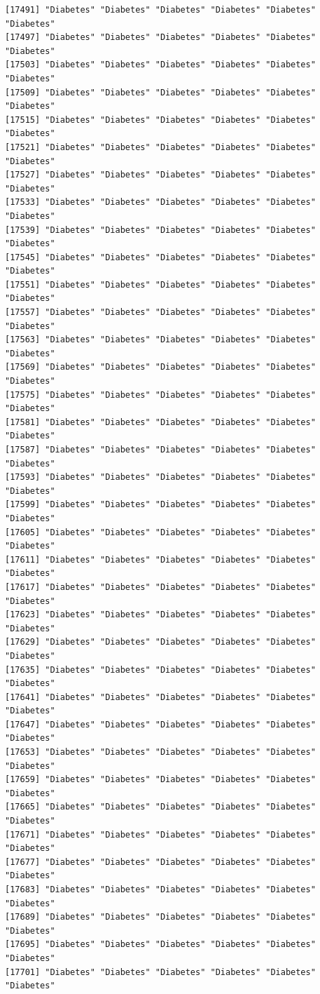 \documentclass[
  letterpaper,
  DIV=11,
  numbers=noendperiod]{scrartcl}
\begin{document}
\begin{verbatim}
[17491] "Diabetes" "Diabetes" "Diabetes" "Diabetes" "Diabetes" "Diabetes"
[17497] "Diabetes" "Diabetes" "Diabetes" "Diabetes" "Diabetes" "Diabetes"
[17503] "Diabetes" "Diabetes" "Diabetes" "Diabetes" "Diabetes" "Diabetes"
[17509] "Diabetes" "Diabetes" "Diabetes" "Diabetes" "Diabetes" "Diabetes"
[17515] "Diabetes" "Diabetes" "Diabetes" "Diabetes" "Diabetes" "Diabetes"
[17521] "Diabetes" "Diabetes" "Diabetes" "Diabetes" "Diabetes" "Diabetes"
[17527] "Diabetes" "Diabetes" "Diabetes" "Diabetes" "Diabetes" "Diabetes"
[17533] "Diabetes" "Diabetes" "Diabetes" "Diabetes" "Diabetes" "Diabetes"
[17539] "Diabetes" "Diabetes" "Diabetes" "Diabetes" "Diabetes" "Diabetes"
[17545] "Diabetes" "Diabetes" "Diabetes" "Diabetes" "Diabetes" "Diabetes"
[17551] "Diabetes" "Diabetes" "Diabetes" "Diabetes" "Diabetes" "Diabetes"
[17557] "Diabetes" "Diabetes" "Diabetes" "Diabetes" "Diabetes" "Diabetes"
[17563] "Diabetes" "Diabetes" "Diabetes" "Diabetes" "Diabetes" "Diabetes"
[17569] "Diabetes" "Diabetes" "Diabetes" "Diabetes" "Diabetes" "Diabetes"
[17575] "Diabetes" "Diabetes" "Diabetes" "Diabetes" "Diabetes" "Diabetes"
[17581] "Diabetes" "Diabetes" "Diabetes" "Diabetes" "Diabetes" "Diabetes"
[17587] "Diabetes" "Diabetes" "Diabetes" "Diabetes" "Diabetes" "Diabetes"
[17593] "Diabetes" "Diabetes" "Diabetes" "Diabetes" "Diabetes" "Diabetes"
[17599] "Diabetes" "Diabetes" "Diabetes" "Diabetes" "Diabetes" "Diabetes"
[17605] "Diabetes" "Diabetes" "Diabetes" "Diabetes" "Diabetes" "Diabetes"
[17611] "Diabetes" "Diabetes" "Diabetes" "Diabetes" "Diabetes" "Diabetes"
[17617] "Diabetes" "Diabetes" "Diabetes" "Diabetes" "Diabetes" "Diabetes"
[17623] "Diabetes" "Diabetes" "Diabetes" "Diabetes" "Diabetes" "Diabetes"
[17629] "Diabetes" "Diabetes" "Diabetes" "Diabetes" "Diabetes" "Diabetes"
[17635] "Diabetes" "Diabetes" "Diabetes" "Diabetes" "Diabetes" "Diabetes"
[17641] "Diabetes" "Diabetes" "Diabetes" "Diabetes" "Diabetes" "Diabetes"
[17647] "Diabetes" "Diabetes" "Diabetes" "Diabetes" "Diabetes" "Diabetes"
[17653] "Diabetes" "Diabetes" "Diabetes" "Diabetes" "Diabetes" "Diabetes"
[17659] "Diabetes" "Diabetes" "Diabetes" "Diabetes" "Diabetes" "Diabetes"
[17665] "Diabetes" "Diabetes" "Diabetes" "Diabetes" "Diabetes" "Diabetes"
[17671] "Diabetes" "Diabetes" "Diabetes" "Diabetes" "Diabetes" "Diabetes"
[17677] "Diabetes" "Diabetes" "Diabetes" "Diabetes" "Diabetes" "Diabetes"
[17683] "Diabetes" "Diabetes" "Diabetes" "Diabetes" "Diabetes" "Diabetes"
[17689] "Diabetes" "Diabetes" "Diabetes" "Diabetes" "Diabetes" "Diabetes"
[17695] "Diabetes" "Diabetes" "Diabetes" "Diabetes" "Diabetes" "Diabetes"
[17701] "Diabetes" "Diabetes" "Diabetes" "Diabetes" "Diabetes" "Diabetes"

\end{verbatim}
\end{document}
